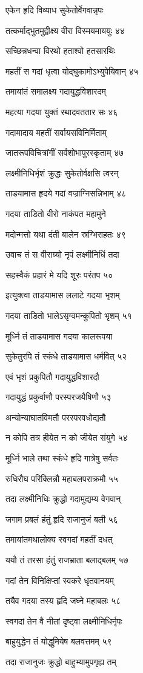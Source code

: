 एकेन हृदि विव्याध सुकेतोर्वेगवान्नृपः

तत्कर्माद्भुतमुद्वीक्ष्य वीरा विस्मयमाययुः ४४

सच्छिन्नधन्वा विरथो हताश्वो हतसारथिः

महतीं स गदां धृत्वा योद्घुकामोऽभ्युपेयिवान् ४५

तमायांतं समालक्ष्य गदायुद्धविशारदम्

महत्या गदया युक्तं रथादवततार सः ४६

गदामादाय महतीं सर्वायसविनिर्मिताम्

जातरूपविचित्रांगीं सर्वशोभापुरस्कृताम् ४७

लक्ष्मीनिधिर्भृशं क्रुद्धः सुकेतोर्वक्षसि त्वरन्

ताडयामास हृदये गदां वज्राग्निसन्निभाम् ४८

गदया ताडितो वीरो नाकंपत महामुने

मदोन्मत्तो यथा दंती बालेन स्रग्भिराहतः ४९

उवाच तं स वीराग्र्यो नृपं लक्ष्मीनिधिं तदा

सहस्वैकं प्रहारं मे यदि शूरः परंतप ५०

इत्युक्त्वा ताडयामास ललाटे गदया भृशम्

गदया ताडितो भालेऽसृग्वमन्कुपितो भृशम् ५१

मूर्ध्नि तं ताडयामास गदया कालरूपया

सुकेतुरपि तं स्कंधे ताडयामास धर्मवित् ५२

एवं भृशं प्रकुपितौ गदायुद्धविशारदौ

गदायुद्धं प्रकुर्वाणौ परस्परजयैषिणौ ५३

अन्योन्याघातविमतौ परस्परवधोद्यतौ

न कोपि तत्र हीयेत न को जीयेत संयुगे ५४

मूर्ध्नि भाले तथा स्कंधे हृदि गात्रेषु सर्वतः

रुधिरौघ परिक्लिन्नौ महाबलपराक्रमौ ५५

तदा लक्ष्मीनिधिः क्रुद्धो गदामुद्यम्य वेगवान्

जगाम प्रबलं हंतुं हृदि राजानुजं बली ५६

तमायांतमथालोक्य स्वगदां महतीं दधत्

ययौ तं तरसा हंतुं राजभ्राता बलाद्बलम् ५७

गदां तेन विनिक्षिप्तां स्वकरे धृतवानयम्

तयैव गदया तस्य हृदि जघ्ने महाबलः ५८

स्वगदां तेन वै नीतां दृष्ट्वा लक्ष्मीनिधिर्नृपः

बाहुयुद्धेन तं योद्धुमियेष बलवत्तमम् ५९

तदा राजानुजः क्रुद्धो बाहुभ्यामुपगृह्य तम्

